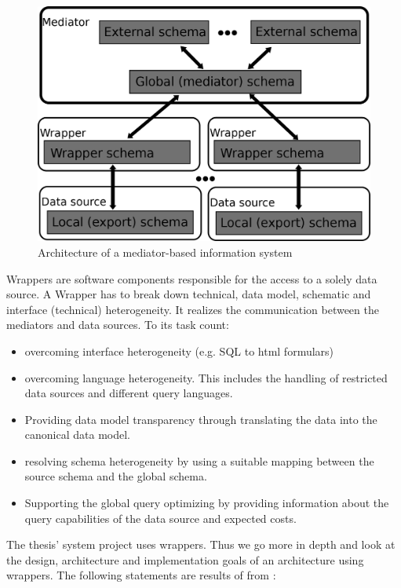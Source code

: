 \begin{figure}[H]
	\begin{center}
		\includegraphics[scale=0.5]{figures/MediatorBasedArchitecture.png}
	\end{center}
	\caption{Architecture of a  mediator-based information system \cite[p. 97]{DBLP:books/dp/LeserN2006}}
	\label{MediatorBasedArchitecture}
\end{figure}

Wrappers are software components responsible for the access to a solely data source.
A Wrapper has to break down technical, data model, schematic and interface (technical) heterogeneity. It realizes the communication between the mediators and data sources. To its task count:
\begin{itemize}
\item overcoming interface heterogeneity (e.g. SQL to html formulars)
\item overcoming language heterogeneity. This includes the handling of restricted data sources and different query languages.
\item Providing data model transparency through translating the data into the canonical data model.
\item resolving schema heterogeneity by using a suitable mapping between the source schema and the global schema.
\item Supporting the global query optimizing by providing information about the query capabilities of the data source and expected costs.
\end{itemize}

The thesis' system project uses wrappers. Thus we go more in depth and look at the design, architecture and implementation goals of an architecture using wrappers. The following statements are results of from \cite{Roth:1997:DSW:645923.670992}:

